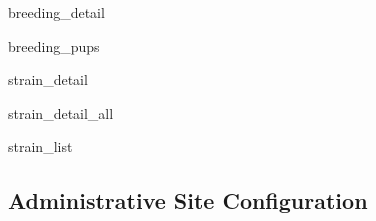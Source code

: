 \documentclass[letterpaper,10pt,english]{sphinxmanual}
\begin{document}
\hypertarget{animal.views.breeding_detail}{}\begin{memberdesc}{breeding\_detail}\end{memberdesc}

\hypertarget{animal.views.breeding_pups}{}\begin{memberdesc}{breeding\_pups}\end{memberdesc}

\hypertarget{animal.views.strain_detail}{}\begin{memberdesc}{strain\_detail}\end{memberdesc}

\hypertarget{animal.views.strain_detail_all}{}\begin{memberdesc}{strain\_detail\_all}\end{memberdesc}

\hypertarget{animal.views.strain_list}{}\begin{memberdesc}{strain\_list}\end{memberdesc}
\hypertarget{module-animal.urls}{}
\modulesynopsis{}

\subsection{Administrative Site Configuration}
\hypertarget{module-animal.admin}{}
\modulesynopsis{}
\end{document}
